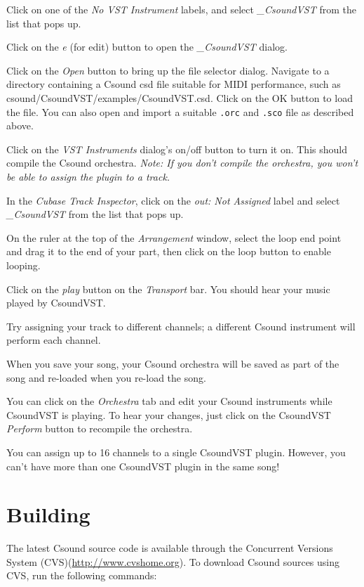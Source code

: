 \documentclass[10pt,letterpaper,onecolumn]{book}
\begin{document}
Click on one of the \emph{No VST Instrument} labels, and select \emph{\_CsoundVST} from the list that pops up. 

Click on the \emph{e} (for edit) button to open the \emph{\_CsoundVST} dialog. 

Click on the \emph{Open} button to bring up the file selector dialog. Navigate to a directory containing a Csound csd file suitable for MIDI performance, such as csound/CsoundVST/examples/CsoundVST.csd. Click on the OK button to load the file. You can also open and import a suitable \texttt{.orc} and \texttt{.sco} file as described above. 

Click on the \emph{VST Instruments} dialog's on/off button to turn it on. This should compile the Csound orchestra. \emph{Note: If you don't compile the orchestra, you won't be able to assign the plugin to a track.} 

In the \emph{Cubase Track Inspector}, click on the \emph{out: Not Assigned} label and select \emph{\_CsoundVST} from the list that pops up. 

On the ruler at the top of the \emph{Arrangement} window, select the loop end point and drag it to the end of your part, then click on the loop button to enable looping. 

Click on the \emph{play} button on the \emph{Transport} bar. You should hear your music played by CsoundVST. 

Try assigning your track to different channels; a different Csound instrument will perform each channel. 

When you save your song, your Csound orchestra will be saved as part of the song and re-loaded when you re-load the song. 

You can click on the \emph{Orchestra} tab and edit your Csound instruments while CsoundVST is playing. To hear your changes, just click on the CsoundVST \emph{Perform} button to recompile the orchestra. 

You can assign up to 16 channels to a single CsoundVST plugin. However, you can't have more than one CsoundVST plugin in the same song! 

\section{Building}

The latest Csound source code is available through the Concurrent Versions System (CVS)(\url{http://www.cvshome.org}). To download Csound sources using CVS, run the following commands:
\end{document}
